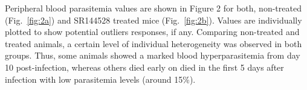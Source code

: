 \documentclass[empirical, authordate]{jote-new-article}
\begin{document}
Peripheral blood parasitemia values are shown in Figure 2 for both, non-treated (Fig.~\ref{fig:2a}) and SR144528 treated mice (Fig.~\ref{fig:2b}). Values are individually plotted to show potential outliers responses, if any. Comparing non-treated and treated animals, a certain level of individual heterogeneity was observed in both groups. Thus, some animals showed a marked blood hyperparasitemia from day 10 post-infection, whereas others died early on died in the first 5 days after infection with low parasitemia levels (around 15\%).

\begin{figure}[h!]
  \begin{fullwidth}
    \raggedright
    \caption{}
    \label{fig:3}
  \end{fullwidth}
\end{figure}
\end{document}
